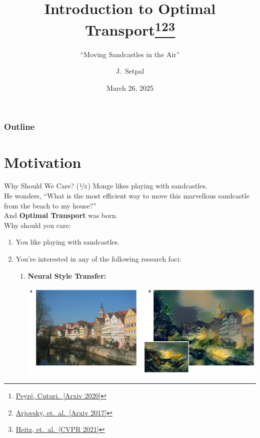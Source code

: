 \documentclass{beamer}
\title[Optimal Transport]{Introduction to Optimal Transport\thanks{\href{https://arxiv.org/abs/1803.00567}{Peyré, Cuturi.~[Arxiv 2020]}}\thanks{\href{https://arxiv.org/abs/1701.07875}{Arjovsky, et.~al.~[Arxiv 2017]}}\thanks{\href{https://arxiv.org/abs/2006.07229}{Heitz, et.~al.~[CVPR 2021]}}}
\subtitle{``Moving Sandcastles in the Air''}
\author[ECE ML Reading Group] %
{J.~Setpal}
\date{March 26, 2025}
\begin{document}
\frame{\titlepage}


\begin{frame}
\frametitle{Outline}
\tableofcontents
\end{frame}

\section{Motivation}

\begin{frame}{Why Should We Care? ($\nicefrac{1}{3}$)}
	Monge likes playing with sandcastles. \newline \\

	He wonders, ``What is the most efficient way to move this marvellous sandcastle from the beach to my house?'' \newline \\

	And \textbf{Optimal Transport} was born. \pause \newline \\

	Why should you care:
	\begin{enumerate}[label=\arabic*.]
		\item You like playing with sandcastles. \pause
		\item You're interested in any of the following research foci:
			\begin{enumerate}[label=\alph*.]
				\item \bf Neural Style Transfer:
					\begin{center}
						\includegraphics[width=.6\textwidth]{img/styletransfer.png}
					\end{center}
			\end{enumerate}
	\end{enumerate}
\end{frame}
\end{document}
